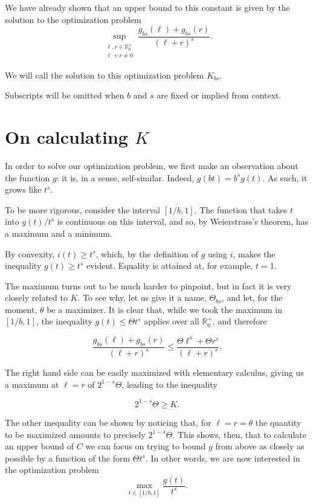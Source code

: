 \documentclass[11pt, reqno]{amsart}
\newcommand{\R}{\mathbb{R}}
\begin{document}
We have already shown that an upper bound to this constant is given by the solution to the optimization problem
\[ \sup_{\substack{\ell,r \in \R^+_0\\\ell+r \neq 0}} \frac{g_{bs}(\ell) + g_{bs}(r)}{(\ell + r)^s}.\]

We will call the solution to this optimization problem $K_{bs}$.

Subscripts will be omitted when $b$ and $s$ are fixed or implied from context.

\section{On calculating $K$} \label{calck}

In order to solve our optimization problem, we first make an observation about the function $g$: it is, in a sense, self-similar. Indeed, $g(b t) = b^s g(t)$. As such, it grows like $t^s$.

To be more rigorous, consider the interval $\left[ 1/b, 1 \right]$. The function that takes $t$ into $g(t)/t^s$ is continuous on this interval, and so, by Weierstrass's theorem, has a maximum and a minimum.

By convexity, $i(t) \geq t^s$, which, by the definition of $g$ using $i$, makes the inequality $g(t) \geq t^s$ evident. Equality is attained at, for example, $t = 1$.

The maximum turns out to be much harder to pinpoint, but in fact it is very closely related to $K$. To see why, let us give it a name, $\Theta_{bs}$, and let, for the moment, $\theta$ be a maximizer. It is clear that, while we took the maximum in $\left[ 1/b, 1 \right]$, the inequality $g(t) \leq \Theta t^s$ applies over all $\R^+_0$, and therefore

\[\frac{g_{bs}(\ell) + g_{bs}(r)}{(\ell + r)^s} \leq \frac{\Theta \ell^s + \Theta r^s}{(\ell+r)^s}.\]

The right hand side can be easily maximized with elementary calculus, giving us a maximum at $\ell = r$ of $2^{1-s} \Theta$, leading to the inequality

\[ 2^{1-s} \Theta \geq K.\]

The other inequality can be shown by noticing that, for $\ell = r = \theta$ the quantity to be maximized amounts to precisely $2^{1-s} \Theta$. This shows, then, that to calculate an upper bound of $C$ we can focus on trying to bound $g$ from above as closely as possible by a function of the form $\Theta t^s$. In other words, we are now interested in the optimization problem
\[ \max_{t \in \left[ 1/b, 1 \right]} \frac{g(t)}{t^s}.\]
\end{document}
